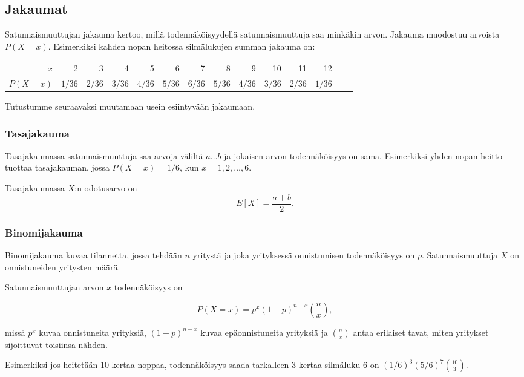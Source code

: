 \subsection{Jakaumat}

Satunnaismuuttujan jakauma kertoo,
millä todennäköisyydellä satunnaismuuttuja
saa minkäkin arvon.
Jakauma muodostuu arvoista $P(X=x)$.
Esimerkiksi kahden nopan heitossa
silmälukujen summan jakauma on:
\begin{center}
\small {
\begin{tabular}{r|rrrrrrrrrrrrr}
$x$ & 2 & 3 & 4 & 5 & 6 & 7 & 8 & 9 & 10 & 11 & 12 \\
$P(X=x)$ & $1/36$ & $2/36$ & $3/36$ & $4/36$ & $5/36$ & $6/36$ & $5/36$ & $4/36$ & $3/36$ & $2/36$ & $1/36$ \\
\end{tabular}
}
\end{center}
Tutustumme seuraavaksi muutamaan usein esiintyvään jakaumaan.

\subsubsection*{Tasajakauma}

Tasajakaumassa satunnaismuuttuja
saa arvoja väliltä $a \ldots b$
ja jokaisen arvon todennäköisyys on sama.
Esimerkiksi yhden nopan heitto tuottaa tasajakauman,
jossa $P(X=x)=1/6$, kun $x=1,2,\ldots,6$.

Tasajakaumassa $X$:n odotusarvo on
\[E[X] = \frac{a+b}{2}.\]

\subsubsection*{Binomijakauma}

Binomijakauma kuvaa tilannetta, jossa tehdään $n$
yritystä ja joka yrityksessä onnistumisen
todennäköisyys on $p$. Satunnaismuuttuja $X$
on onnistuneiden yritysten määrä.

Satunnaismuuttujan arvon $x$ todennäköisyys on

\[P(X=x)=p^x (1-p)^{n-x} {n \choose x},\]

missä $p^x$ kuvaa onnistuneita yrityksiä,
$(1-p)^{n-x}$ kuvaa epäonnistuneita yrityksiä
ja ${n \choose x}$ antaa erilaiset tavat,
miten yritykset sijoittuvat toisiinsa nähden.

Esimerkiksi jos heitetään 10 kertaa noppaa,
todennäköisyys saada tarkalleen 3 kertaa silmäluku 6
on $(1/6)^3 (5/6)^7 {10 \choose 3}$.

